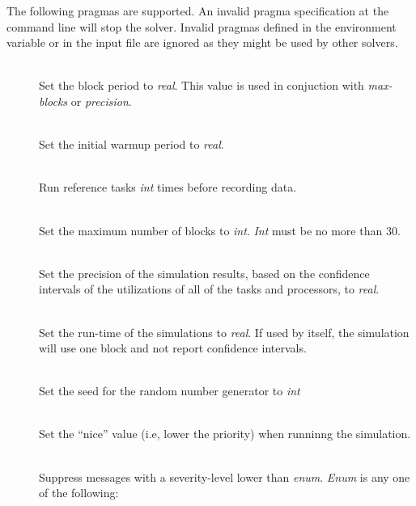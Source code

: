 The following pragmas are supported.  An invalid pragma
specification at the command line
will stop the solver.  Invalid pragmas defined in the environment
variable or in the input file are
ignored as they might be used by other solvers.
\begin{description}

\item[]~\\
  Set the block period to \emph{real}.  This value is used in conjuction with \emph{max-blocks} or
  \emph{precision}.
\item[]~\\
  Set the initial warmup period to \emph{real}.
\item[]~\\
  Run reference tasks \emph{int} times before recording data.
\item[]~\\
  Set the maximum number of blocks to \emph{int}.  \emph{Int} must be no more than 30.
\item[]~\\
  Set the precision of the simulation results, based on the confidence intervals of the utilizations of all
  of the tasks and processors, to \emph{real}.
\item[]~\\
  Set the run-time of the simulations to \emph{real}.  If used by itself, the simulation will use one block
  and not report confidence intervals.
\item[]~\\
  Set the seed for the random number generator to \emph{int}
\item[]~\\
  Set the ``nice'' value (i.e, lower the priority) when runninng the simulation.
\item[]~\\
  Suppress messages with a severity-level lower than \emph{enum}. \emph{Enum} is any one of
  the following:
  \begin{description}

\end{description}
\end{description}
